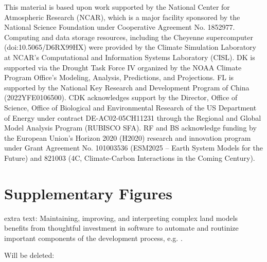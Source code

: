 \documentclass[draft]{agujournal2019}
\begin{document}
\acknowledgments
This material is based upon work supported by the National Center for Atmospheric Research (NCAR), which is a major facility sponsored by the National Science Foundation under Cooperative Agreement No. 1852977. Computing and data storage resources, including the Cheyenne supercomputer (doi:10.5065/D6RX99HX) were provided by the Climate Simulation Laboratory at NCAR’s Computational and Information Systems Laboratory (CISL). DK is supported via the Drought Task Force IV organized by the NOAA Climate Program Office’s Modeling, Analysis, Predictions, and Projections. FL is supported by the National Key Research and Development Program of China (2022YFE0106500). CDK acknowledges support by the Director, Office of Science, Office of Biological and Environmental Research of the US Department of Energy under contract DE-AC02-05CH11231 through the Regional and Global Model Analysis Program (RUBISCO SFA). RF and BS acknowledge funding by the European Union’s Horizon 2020 (H2020) research and innovation program under Grant Agreement No. 101003536 (ESM2025 – Earth System Models for the Future) and 821003 (4C, Climate-Carbon Interactions in the Coming Century).





\appendix
\section{Supplementary Figures}


extra text:
Maintaining, improving, and interpreting complex land models benefits from thoughtful investment in software to automate and routinize important components of the development process, e.g. . 

Will be deleted:
\end{document}
